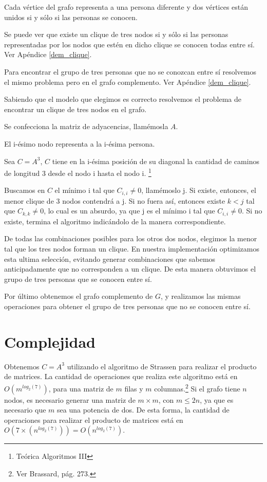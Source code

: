 \documentclass[a4paper, 12pt]{article}
\begin{document}
Cada v\'ertice del grafo representa a una persona diferente y dos v\'ertices est\'an unidos si y s\'olo si las personas se conocen.


Se puede ver que existe un clique de tres nodos si y s\'olo si las personas representadas por los nodos que est\'en en dicho clique se conocen todas entre s\'i. Ver Ap\'endice \ref{dem_clique}.


Para encontrar el grupo de tres personas que no se conozcan entre s\'i resolvemos el mismo problema pero en el grafo complemento. Ver Ap\'endice \ref{dem_clique}.


Sabiendo que el modelo que elegimos es correcto resolvemos el problema de encontrar un clique de tres nodos en el grafo.


Se confecciona la matriz de adyacencias, llam\'emosla $A$.


El i-\'esimo nodo representa a la i-\'esima persona.


Sea $C = A^3$, $C$ tiene en la i-\'esima posici\'on de su diagonal la cantidad de caminos de longitud 3 desde el nodo i hasta el nodo i. \footnote{Te\'orica Algoritmos III}   

 
Buscamos en $C$ el m\'inimo i tal que $C_{i,i} \neq 0$, llam\'emoslo j. Si existe, entonces, el menor clique de 3 nodos contendr\'a a j. Si no fuera as\'i, entonces existe $k < j$ tal que $C_{k,k} \neq 0$, lo cual es un absurdo, ya que j es el m\'inimo i tal que $C_{i,i} \neq 0$. Si no existe, termina el algoritmo indic\'andolo de la manera correspondiente.


De todas las combinaciones posibles para los otros dos nodos, elegimos la menor tal que los tres nodos forman un clique. En nuestra implementaci\'on optimizamos esta ultima selecci\'on, evitando generar combinaciones que sabemos anticipadamente que no corresponden a un clique. De esta manera obtuvimos el grupo de tres personas que se conocen entre s\'i.


Por \'ultimo obtenemos el grafo complemento de $G$, y realizamos las mismas operaciones para obtener el grupo de tres personas que no se conocen entre s\'i.



\section*{Complejidad}


Obtenemos $C = A^3$ utilizando el algoritmo de Strassen para realizar el producto de matrices. La cantidad de operaciones que realiza este algoritmo est\'a en $O\left(m^{log_2\left(7\right)}\right)$, para una matriz de $m$ filas y $m$ columnas.\footnote{Ver Brassard, p\'ag. 273.} Si el grafo tiene $n$ nodos, es necesario generar una matriz de $m \times m$, con $m \leq 2n$, ya que es necesario que $m$ sea una potencia de dos. De esta forma, la cantidad de operaciones para realizar el producto de matrices est\'a en $O\left(7 \times \left(n ^{log_2 \left( 7\right)} \right) \right) = O\left(n^{log_2\left(7\right)}\right)$.
\end{document}
